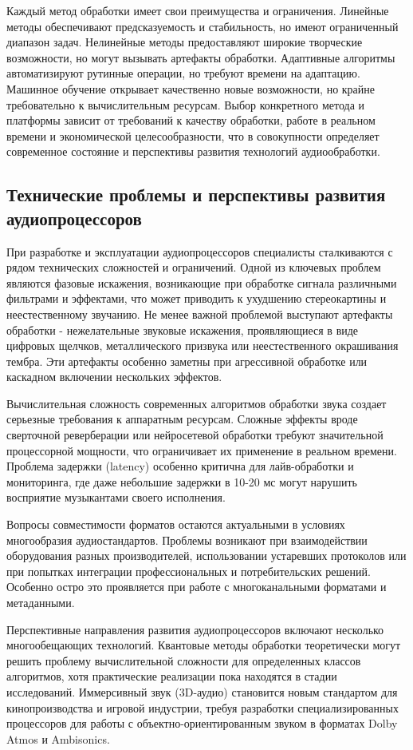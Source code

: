 Каждый метод обработки имеет свои преимущества и ограничения. Линейные методы обеспечивают предсказуемость и стабильность, но имеют ограниченный диапазон задач. Нелинейные методы предоставляют широкие творческие возможности, но могут вызывать артефакты обработки. Адаптивные алгоритмы автоматизируют рутинные операции, но требуют времени на адаптацию. Машинное обучение открывает качественно новые возможности, но крайне требовательно к вычислительным ресурсам. Выбор конкретного метода и платформы зависит от требований к качеству обработки, работе в реальном времени и экономической целесообразности, что в совокупности определяет современное состояние и перспективы развития технологий аудиообработки.

\subsection{Технические проблемы и перспективы развития аудиопроцессоров}
При разработке и эксплуатации аудиопроцессоров специалисты сталкиваются с рядом технических сложностей и ограничений. Одной из ключевых проблем являются фазовые искажения, возникающие при обработке сигнала различными фильтрами и эффектами, что может приводить к ухудшению стереокартины и неестественному звучанию. Не менее важной проблемой выступают артефакты обработки - нежелательные звуковые искажения, проявляющиеся в виде цифровых щелчков, металлического призвука или неестественного окрашивания тембра. Эти артефакты особенно заметны при агрессивной обработке или каскадном включении нескольких эффектов.

Вычислительная сложность современных алгоритмов обработки звука создает серьезные требования к аппаратным ресурсам. Сложные эффекты вроде сверточной реверберации или нейросетевой обработки требуют значительной процессорной мощности, что ограничивает их применение в реальном времени. Проблема задержки (latency) особенно критична для лайв-обработки и мониторинга, где даже небольшие задержки в 10-20 мс могут нарушить восприятие музыкантами своего исполнения.

Вопросы совместимости форматов остаются актуальными в условиях многообразия аудиостандартов. Проблемы возникают при взаимодействии оборудования разных производителей, использовании устаревших протоколов или при попытках интеграции профессиональных и потребительских решений. Особенно остро это проявляется при работе с многоканальными форматами и метаданными.

Перспективные направления развития аудиопроцессоров включают несколько многообещающих технологий. Квантовые методы обработки теоретически могут решить проблему вычислительной сложности для определенных классов алгоритмов, хотя практические реализации пока находятся в стадии исследований. Иммерсивный звук (3D-аудио) становится новым стандартом для кинопроизводства и игровой индустрии, требуя разработки специализированных процессоров для работы с объектно-ориентированным звуком в форматах Dolby Atmos и Ambisonics.


